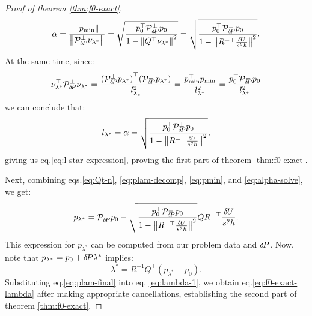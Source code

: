 \documentclass[smallcondensed]{svjour3}
\begin{document}
\begin{proof}[Proof of theorem \ref{thm:f0-exact}]
\begin{equation}
    \alpha = \frac{\left\|p_{\operatorname{min}}\right\|}{\left\|\mathcal{P}^\perp_{{\delta \hspace{-0.14em} P}} \nu_{\lambda^*}\right\|} = \sqrt{\frac{p_0^\top \mathcal{P}^\perp_{{\delta \hspace{-0.14em} P}} p_0}{1 - \left\|Q^\top \nu_{\lambda^*}\right\|^2}} = \sqrt{\frac{p_0^\top \mathcal{P}^\perp_{{\delta \hspace{-0.14em} P}} p_0}{1 - \left\|R^{-\top} \frac{{\delta \hspace{-0.09em} U}}{s^\theta h}\right\|^2}}.
  \end{equation}
  At the same time, since:
  \begin{equation}
    \nu_{\lambda^*}^\top \mathcal{P}^\perp_{{\delta \hspace{-0.14em} P}} \nu_{\lambda^*} = \frac{{(\mathcal{P}^\perp_{{\delta \hspace{-0.14em} P}} p_{\lambda^*})}^\top {(\mathcal{P}^\perp_{{\delta \hspace{-0.14em} P}} p_{\lambda^*})}}{l_{\lambda_*}^2} = \frac{p_{\operatorname{min}}^\top p_{\operatorname{min}}}{l_{\lambda^*}^2} = \frac{p_0^\top \mathcal{P}^\perp_{{\delta \hspace{-0.14em} P}} p_0}{l_{\lambda^*}^2}
  \end{equation}
  we can conclude that:
  \begin{equation}
    l_{\lambda^*} = \alpha = \sqrt{\frac{p_0^\top \mathcal{P}^\perp_{{\delta \hspace{-0.14em} P}} p_0}{1 - \left\|R^{-\top} \frac{{\delta \hspace{-0.09em} U}}{s^\theta h}\right\|^2}},
  \end{equation}
  giving us eq.\@ \ref{eq:l-star-expression}, proving the first
  part of theorem \ref{thm:f0-exact}.

  Next, combining eqs.\@ \ref{eq:Qt-n}, \ref{eq:plam-decomp},
  \ref{eq:pmin}, and \ref{eq:alpha-solve}, we get:
  \begin{equation}\label{eq:plam-final}
    p_{\lambda^*} = \mathcal{P}^\perp_{{\delta \hspace{-0.14em} P}} p_0 - \sqrt{\frac{p_0^\top \mathcal{P}^\perp_{{\delta \hspace{-0.14em} P}} p_0}{1 - \left\|R^{-\top} \frac{{\delta \hspace{-0.09em} U}}{s^\theta h}\right\|^2}} Q R^{-\top} \frac{{\delta \hspace{-0.09em} U}}{s^\theta h}.
  \end{equation}
  This expression for $p_{\lambda^*}$ can be computed from our problem
  data and ${\delta \hspace{-0.14em} P}$. Now, note that
  $p_{\lambda^*} = p_0 + {\delta \hspace{-0.14em} P} \lambda^*$ implies:
  \begin{equation}\label{eq:lambda-1}
    \lambda^* = R^{-1} Q^\top (p_{\lambda^*} - p_0).
  \end{equation}
  Substituting eq.\@ \ref{eq:plam-final} into eq.\@
  \ref{eq:lambda-1}, we obtain eq.\@ \ref{eq:f0-exact-lambda} after
  making appropriate cancellations, establishing the second part of
  theorem \ref{thm:f0-exact}.


\end{proof}
\end{document}

